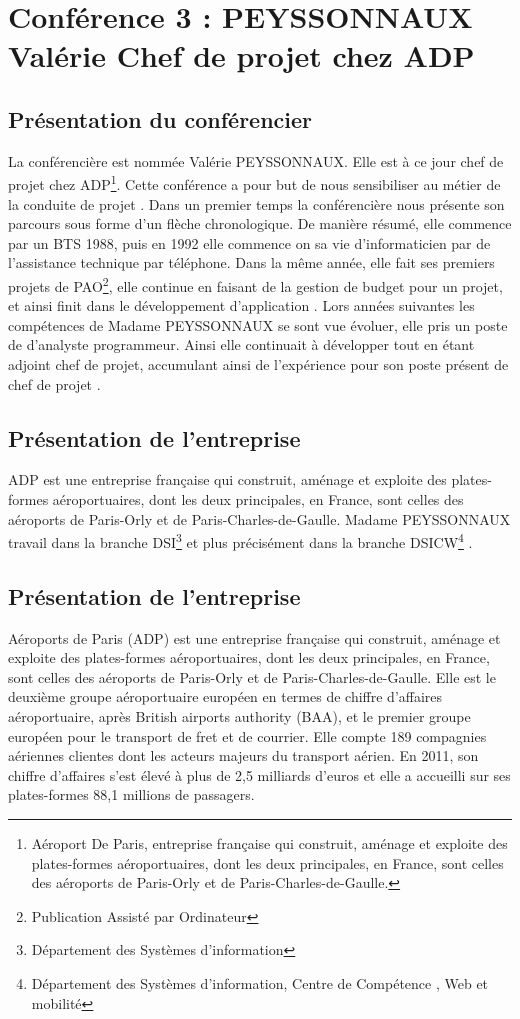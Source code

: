\section{Conférence 3 : PEYSSONNAUX Valérie Chef de projet chez ADP}
 	\subsection{Présentation du conférencier}
 La conférencière est nommée Valérie PEYSSONNAUX. Elle est à ce jour chef de projet chez ADP\footnote{Aéroport De Paris, entreprise française qui construit, aménage et exploite des plates-formes aéroportuaires, dont les deux principales, en France, sont celles des aéroports de Paris-Orly et de Paris-Charles-de-Gaulle.}. Cette conférence a pour but de nous sensibiliser au métier de la conduite de projet .
 	Dans un premier temps la conférencière nous présente son parcours sous forme d'un flèche chronologique. De manière résumé, elle commence par un BTS 1988, puis en 1992 elle commence on sa vie d'informaticien par de l'assistance technique par téléphone. Dans la même année, elle fait ses premiers projets de PAO\footnote{Publication Assisté par Ordinateur}, elle continue en faisant de la gestion de budget pour un projet, et ainsi finit dans le développement d'application . Lors années suivantes  les compétences de Madame PEYSSONNAUX se sont vue évoluer, elle pris un poste de d'analyste programmeur. Ainsi elle continuait à développer  tout en étant adjoint chef de projet, accumulant ainsi de l'expérience pour son poste présent de chef de projet .
  	\subsection{Présentation de l'entreprise}
  	ADP est une entreprise française qui construit, aménage et exploite des plates-formes aéroportuaires, dont les deux principales, en France, sont celles des aéroports de Paris-Orly et de Paris-Charles-de-Gaulle. Madame PEYSSONNAUX travail dans la branche DSI\footnote{Département des Systèmes d'information} et plus précisément dans la branche DSICW\footnote{Département des Systèmes d'information, Centre de Compétence , Web et mobilité} . 

  	\subsection{Présentation de l'entreprise} 
  	\label{sub:presentation_de_l_entreprise}
  	Aéroports de Paris (ADP) est une entreprise française qui construit, aménage et exploite des plates-formes aéroportuaires, dont les deux principales, en France, sont celles des aéroports de Paris-Orly et de Paris-Charles-de-Gaulle.
	Elle est le deuxième groupe aéroportuaire européen en termes de chiffre d'affaires aéroportuaire, après British airports authority (BAA), et le premier groupe européen pour le transport de fret et de courrier. Elle compte 189 compagnies aériennes clientes dont les acteurs majeurs du transport aérien. En 2011, son chiffre d'affaires s'est élevé à plus de 2,5 milliards d'euros et elle a accueilli sur ses plates-formes 88,1 millions de passagers.

